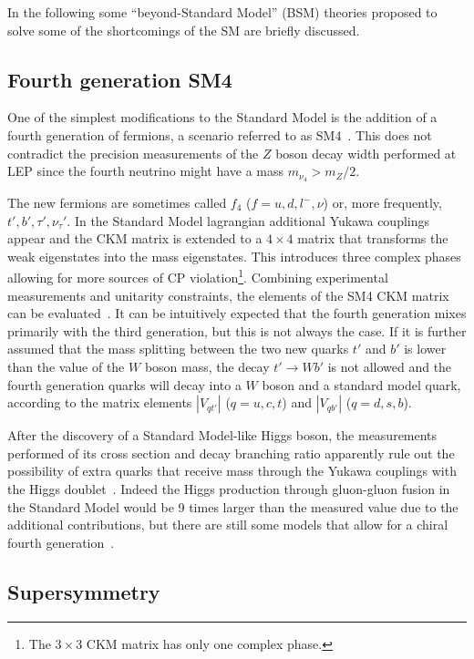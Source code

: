 In the following some ``beyond-Standard Model'' (BSM) theories
proposed to solve some of the shortcomings of the SM
are briefly discussed.



\subsection{Fourth generation SM4}\label{sec:sm4}

One of the simplest modifications to the Standard Model
is the addition of a fourth generation of fermions, a
scenario referred to as SM4~\cite{Holdom:2009rf}. 
This does not contradict the precision measurements of the $Z$
boson decay width performed at LEP since the fourth neutrino
might have a mass $m_{\nu_4}>m_{Z}/2$.

The new fermions are sometimes called $f_4$ ($f=u,d,l^{-},\nu$)
or, more frequently, $t', b', \tau', \nu_{\tau}'$. In the
Standard Model lagrangian additional Yukawa couplings appear
and the CKM matrix is extended to a $4\times 4$ matrix that
transforms the weak eigenstates into the mass eigenstates.
This introduces three complex phases allowing for more
sources of CP violation\footnote{The $3\times 3$ CKM
matrix has only one complex phase.}. Combining experimental
measurements and unitarity constraints, the elements of
the SM4 CKM matrix can be evaluated~\cite{Lacker}. It
can be intuitively expected that the fourth generation mixes
primarily with the third generation, but this is not always 
the case. If it is further
assumed that the mass splitting between the two new quarks
$t'$ and $b'$ is lower than the value of the $W$ boson mass,
the decay $t'\to Wb'$ is not allowed and the fourth generation
quarks will decay into a $W$ boson and a standard model quark,
according to the matrix elements $|V_{qt'}|$ ($q=u,c,t$) 
and $|V_{qb'}|$ ($q=d,s,b$).

After the discovery of a Standard Model-like Higgs boson,
the measurements performed of its cross section and decay 
branching ratio apparently rule out the possibility
of extra quarks that receive mass through the Yukawa couplings
with the Higgs doublet~\cite{Djouadi:2012ae}.
Indeed the Higgs production through gluon-gluon fusion
in the Standard Model would be 9 times larger than
the measured value due to the additional contributions,
but there are still some models that allow 
for a chiral fourth generation~\cite{Cetin:2011aa}.



\subsection{Supersymmetry}\label{sec:susy}

